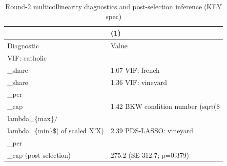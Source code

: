 \documentclass{article}
\begin{document}
\begin{table}[tbp] \centering
{}

\caption{Round-2 multicollinearity diagnostics and post-selection inference (KEY spec)}
\label{tab:diagnostics}
\begin{tabularx}{\linewidth}{@{}lC@{}}

\toprule
&{(1)} \tabularnewline \midrule
{Diagnostic}&{Value} \tabularnewline
\midrule \addlinespace[\belowrulesep]
VIF: catholic\\_share&1.07
VIF: french\\_share&1.36
VIF: vineyard\\_per\\_cap&1.42
BKW condition number (sqrt(\$\\lambda\_\{max\}/\\lambda\_\{min\}\$) of scaled X'X)&2.39
PDS-LASSO: vineyard\\_per\\_cap (post-selection)&275.2 (SE 312.7; p=0.379)
\bottomrule \addlinespace[\belowrulesep]


\end{tabularx}
\end{table}
\end{document}
